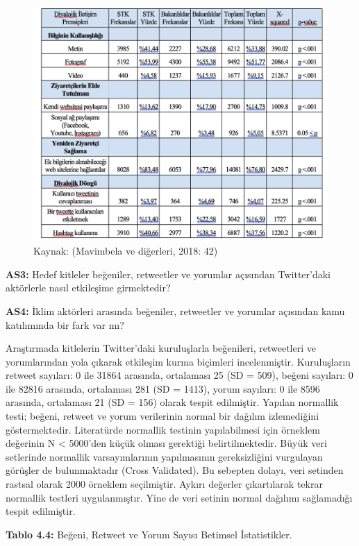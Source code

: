 \documentclass[
]{book}
\begin{document}
\begin{figure}
\includegraphics[width=0.95\linewidth,height=0.95\textheight]{tablolar-sekiller/tablo-4-3} \caption{Kaynak: (Mavimbela ve diğerleri, 2018: 42)}\label{fig:unnamed-chunk-7}
\end{figure}

\textbf{AS3:} Hedef kitleler beğeniler, retweetler ve yorumlar açısından Twitter'daki aktörlerle nasıl etkileşime girmektedir?

\textbf{AS4:} İklim aktörleri arasında beğeniler, retweetler ve yorumlar açısından kamu katılımında bir fark var mı?

Araştırmada kitlelerin Twitter'daki kuruluşlarla beğenileri, retweetleri ve yorumlarından yola çıkarak etkileşim kurma biçimleri incelenmiştir. Kuruluşların retweet sayıları: 0 ile 31864 arasında, ortalaması 25 (SD = 509), beğeni sayıları: 0 ile 82816 arasında, ortalaması 281 (SD = 1413), yorum sayıları: 0 ile 8596 arasında, ortalaması 21 (SD = 156) olarak tespit edilmiştir. Yapılan normallik testi; beğeni, retweet ve yorum verilerinin normal bir dağılım izlemediğini göstermektedir. Literatürde normallik testinin yapılabilmesi için örneklem değerinin N \textless{} 5000'den küçük olması gerektiği belirtilmektedir. Büyük veri setlerinde normallik varsayımlarının yapılmasının gereksizliğini vurgulayan görüşler de bulunmaktadır (Cross Validated). Bu sebepten dolayı, veri setinden rastsal olarak 2000 örneklem seçilmiştir. Aykırı değerler çıkartılarak tekrar normallik testleri uygulanmıştır. Yine de veri setinin normal dağılımı sağlamadığı tespit edilmiştir.

\textbf{Tablo 4.4:} Beğeni, Retweet ve Yorum Sayısı Betimsel İstatistikler.
\end{document}
